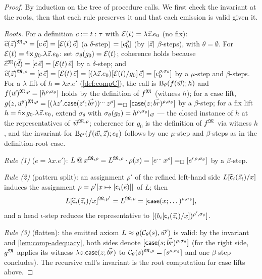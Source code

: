 \begin{proof}
By induction on the tree of procedure calls.  We first check the
invariant at the roots, then that each rule preserves it and that each
emission is valid given it.

\emph{Roots.}  For a definition $c \mathrel{:=} t : \tau$ with $\mathcal{E}(t) =
\lambda \vec{z}.e_0$ (no fix): $\widehat{c}(\vec{z})^{\mathfrak{M},\rho} =
[c\,\vec{e}] = [\mathcal{E}(t)\,\vec{e}]$ (a $\delta$-step) $=
[e_0^{\rho}]$ (by $|\vec{z}|$ $\beta$-steps), with $\theta =
\emptyset$.  For $\mathcal{E}(t) = \mathsf{fix}\,g_0.\lambda\vec{z}.e_0$: set
$\sigma_\theta(g_0) = \mathcal{E}(t)$; coherence holds because
$\widehat{c}^{\mathfrak{M}}(\vec{d}) = [c\,\vec{e}] =
[\mathcal{E}(t)\,\vec{e}]$ by a $\delta$-step; and $\widehat{c}(\vec{z})^{\mathfrak{M},\rho} = [c\,\vec{e}] = [\mathcal{E}(t)\,\vec{e}] =
[(\lambda\vec{z}.e_0)[\mathcal{E}(t)/g_0]\,\vec{e}] =
[e_0^{\rho,\sigma_\theta}]$ by a $\mu$-step and $\beta$-steps.  For a
$\lambda$-lift of $h = \lambda x.e'$ (\cref{def:compC}), the call is
$\mathrm{B}_\theta(f(\vec{w}); h)$ and $f(\vec{w})^{\mathfrak{M},\rho} =
[h^{\rho,\sigma_\theta}]$ holds by the definition of $f^{\mathfrak{M}}$
(witness $h$); for a case lift, $g(z, \vec{w}')^{\mathfrak{M},\rho} =
[(\lambda z'.\mathsf{case}(z';\vec{br}))^{\dots}\, z^\rho]
=_{\square} [\mathsf{case}(z;\vec{br})^{\rho,\sigma_\theta}]$ by a
$\beta$-step; for a fix lift $h = \mathsf{fix}\,g_0.\lambda
\vec{z}.e_0$, extend $\sigma_\theta$ with $\sigma_\theta(g_0) =
h^{\rho,\sigma_\theta}|_{\vec{w}}$ --- the closed instance of $h$ at the
representatives of $\vec{w}^{\mathfrak{M},\rho}$; coherence for $g_0$ is the
definition of $f^{\mathfrak{M}}$ via witness $h$, and the invariant for
$\mathrm{B}_{\theta'}(f(\vec{w},\vec{z}); e_0)$ follows by one $\mu$-step
and $\beta$-steps as in the definition-root case.

\emph{Rule (1)} ($e = \lambda x.e'$): $L \mathbin{@} x^{\mathfrak{M},\rho} =
L^{\mathfrak{M},\rho} \cdot \rho(x) = [e^{\dots}\,x^\rho] =_{\square}
[e'^{\,\rho,\sigma_\theta}]$ by a $\beta$-step.

\emph{Rule (2)} (pattern split): an assignment $\rho'$ of the refined
left-hand side $L[\widehat{\mathsf{c}}_i(\vec{z}_i)/x]$ induces the
assignment $\rho = \rho'[x \mapsto [\mathsf{c}_i(\vec{e})]]$ of $L$;
then
\[
  L[\widehat{\mathsf{c}}_i(\vec{z}_i)/x]^{\mathfrak{M},\rho'} =
  L^{\mathfrak{M},\rho} = [\mathsf{case}(x;\dots)^{\rho,\sigma_\theta}],
\]
and a head $\iota$-step reduces the representative to
$[(b_i[\mathsf{c}_i(\vec{z}_i)/x])^{\rho',\sigma_\theta}]$.

\emph{Rule (3)} (flatten): the emitted axiom $L \approx
g(\mathcal{C}_\theta(s), \vec{w}')$ is valid: by the invariant and
\cref{lem:comp-adequacy}, both sides denote
$[\mathsf{case}(s;\vec{br})^{\rho,\sigma_\theta}]$ (for the right
side, $g^{\mathfrak{M}}$ applies its witness $\lambda z.\mathsf{case}(z;\vec{br})$
to $\mathcal{C}_\theta(s)^{\mathfrak{M},\rho} = [s^{\rho,\sigma_\theta}]$ and one
$\beta$-step concludes).  The recursive call's invariant is the root
computation for case lifts above.


\end{proof}
